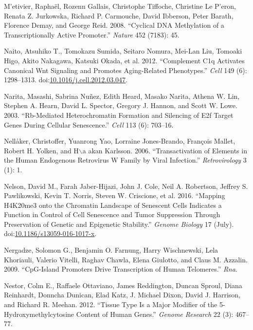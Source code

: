 \documentclass[onehalf,12pt]{beavtex}
\begin{document}
  \hypertarget{ref-MetivierCyclicalDNAmethylation2008}{}
  M\a'etivier, Raphaël, Rozenn Gallais, Christophe Tiffoche, Christine Le
  P\a'eron, Renata Z. Jurkowska, Richard P. Carmouche, David Ibberson,
  Peter Barath, Florence Demay, and George Reid. 2008. ``Cyclical DNA
  Methylation of a Transcriptionally Active Promoter.'' \emph{Nature} 452
  (7183): 45.
  
  \hypertarget{ref-NaitoComplementC1qActivates2012a}{}
  Naito, Atsuhiko T., Tomokazu Sumida, Seitaro Nomura, Mei-Lan Liu,
  Tomoaki Higo, Akito Nakagawa, Katsuki Okada, et al. 2012. ``Complement
  C1q Activates Canonical Wnt Signaling and Promotes Aging-Related
  Phenotypes.'' \emph{Cell} 149 (6): 1298--1313.
  doi:\href{https://doi.org/10.1016/j.cell.2012.03.047}{10.1016/j.cell.2012.03.047}.
  
  \hypertarget{ref-NaritaRbmediatedheterochromatinformation2003}{}
  Narita, Masashi, Sabrina Nuñez, Edith Heard, Masako Narita, Athena W.
  Lin, Stephen A. Hearn, David L. Spector, Gregory J. Hannon, and Scott W.
  Lowe. 2003. ``Rb-Mediated Heterochromatin Formation and Silencing of E2f
  Target Genes During Cellular Senescence.'' \emph{Cell} 113 (6): 703--16.
  
  \hypertarget{ref-NellakerTransactivationelementshuman2006}{}
  Nellåker, Christoffer, Yuanrong Yao, Lorraine Jones-Brando, François
  Mallet, Robert H. Yolken, and H\(\backslash\)a akan Karlsson. 2006.
  ``Transactivation of Elements in the Human Endogenous Retrovirus W
  Family by Viral Infection.'' \emph{Retrovirology} 3 (1): 1.
  
  \hypertarget{ref-NelsonMappingH4K20me3chromatin2016}{}
  Nelson, David M., Farah Jaber-Hijazi, John J. Cole, Neil A. Robertson,
  Jeffrey S. Pawlikowski, Kevin T. Norris, Steven W. Criscione, et al.
  2016. ``Mapping H4K20me3 onto the Chromatin Landscape of Senescent Cells
  Indicates a Function in Control of Cell Senescence and Tumor Suppression
  Through Preservation of Genetic and Epigenetic Stability.'' \emph{Genome
  Biology} 17 (July).
  doi:\href{https://doi.org/10.1186/s13059-016-1017-x}{10.1186/s13059-016-1017-x}.
  
  \hypertarget{ref-NergadzeCpGislandpromotersdrive2009}{}
  Nergadze, Solomon G., Benjamin O. Farnung, Harry Wischnewski, Lela
  Khoriauli, Valerio Vitelli, Raghav Chawla, Elena Giulotto, and Claus M.
  Azzalin. 2009. ``CpG-Island Promoters Drive Transcription of Human
  Telomeres.'' \emph{Rna}.
  
  \hypertarget{ref-NestorTissuetypemajor2012}{}
  Nestor, Colm E., Raffaele Ottaviano, James Reddington, Duncan Sproul,
  Diana Reinhardt, Donncha Dunican, Elad Katz, J. Michael Dixon, David J.
  Harrison, and Richard R. Meehan. 2012. ``Tissue Type Is a Major Modifier
  of the 5-Hydroxymethylcytosine Content of Human Genes.'' \emph{Genome
  Research} 22 (3): 467--77.
  
\end{document}
